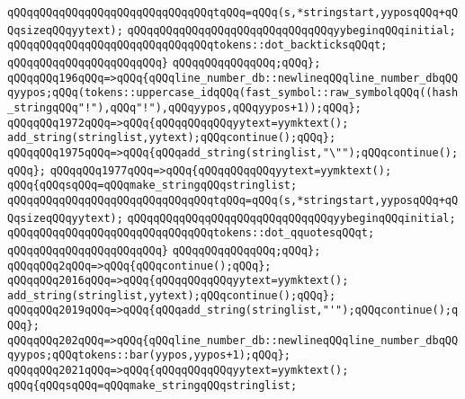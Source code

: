 \verb|qQQqqQQqqQQqqQQqqQQqqQQqqQQqqQQqtqQQq=qQQq(s,*stringstart,yyposqQQq+qQQqsizeqQQqyytext);|\newline
\verb|qQQqqQQqqQQqqQQqqQQqqQQqqQQqqQQqyybeginqQQqinitial;|\newline
\verb|qQQqqQQqqQQqqQQqqQQqqQQqqQQqqQQqtokens::dot_backticksqQQqt;|\newline
\verb|qQQqqQQqqQQqqQQqqQQqqQQq}|\newline
\verb|qQQqqQQqqQQqqQQq;qQQq};|\newline
\verb|qQQqqQQq196qQQq=>qQQq{qQQqline_number_db::newlineqQQqline_number_dbqQQqyypos;qQQq(tokens::uppercase_idqQQq(fast_symbol::raw_symbolqQQq((hash_stringqQQq"!"),qQQq"!"),qQQqyypos,qQQqyypos+1));qQQq};|\newline
\verb|qQQqqQQq1972qQQq=>qQQq{qQQqqQQqqQQqyytext=yymktext();|\newline
\verb|add_string(stringlist,yytext);qQQqcontinue();qQQq};|\newline
\verb|qQQqqQQq1975qQQq=>qQQq{qQQqadd_string(stringlist,"\"");qQQqcontinue();qQQq};|\newline
\verb|qQQqqQQq1977qQQq=>qQQq{qQQqqQQqqQQqyytext=yymktext();|\newline
\verb|qQQq{qQQqsqQQq=qQQqmake_stringqQQqstringlist;|\newline
\verb|qQQqqQQqqQQqqQQqqQQqqQQqqQQqqQQqtqQQq=qQQq(s,*stringstart,yyposqQQq+qQQqsizeqQQqyytext);|\newline
\verb|qQQqqQQqqQQqqQQqqQQqqQQqqQQqqQQqyybeginqQQqinitial;|\newline
\verb|qQQqqQQqqQQqqQQqqQQqqQQqqQQqqQQqtokens::dot_qquotesqQQqt;|\newline
\verb|qQQqqQQqqQQqqQQqqQQqqQQq}|\newline
\verb|qQQqqQQqqQQqqQQq;qQQq};|\newline
\verb|qQQqqQQq2qQQq=>qQQq{qQQqcontinue();qQQq};|\newline
\verb|qQQqqQQq2016qQQq=>qQQq{qQQqqQQqqQQqyytext=yymktext();|\newline
\verb|add_string(stringlist,yytext);qQQqcontinue();qQQq};|\newline
\verb|qQQqqQQq2019qQQq=>qQQq{qQQqadd_string(stringlist,"'");qQQqcontinue();qQQq};|\newline
\verb|qQQqqQQq202qQQq=>qQQq{qQQqline_number_db::newlineqQQqline_number_dbqQQqyypos;qQQqtokens::bar(yypos,yypos+1);qQQq};|\newline
\verb|qQQqqQQq2021qQQq=>qQQq{qQQqqQQqqQQqyytext=yymktext();|\newline
\verb|qQQq{qQQqsqQQq=qQQqmake_stringqQQqstringlist;|\newline
